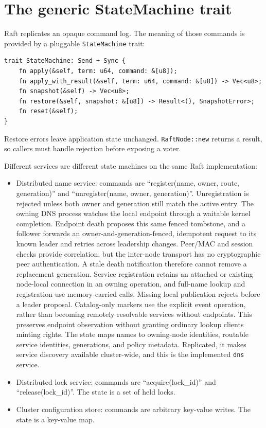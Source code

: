 \section{The generic StateMachine trait}

Raft replicates an opaque command log. The meaning of those commands is provided
by a pluggable \texttt{StateMachine} trait:

\begin{lstlisting}[style=rustCode]
trait StateMachine: Send + Sync {
    fn apply(&self, term: u64, command: &[u8]);
    fn apply_with_result(&self, term: u64, command: &[u8]) -> Vec<u8>;
    fn snapshot(&self) -> Vec<u8>;
    fn restore(&self, snapshot: &[u8]) -> Result<(), SnapshotError>;
    fn reset(&self);
}
\end{lstlisting}

Restore errors leave application state unchanged. \texttt{RaftNode::new}
returns a result, so callers must handle rejection before exposing a voter.

Different services are different state machines on the same Raft implementation:

\begin{itemize}
    \item Distributed name service: commands are
        ``register(name, owner, route, generation)'' and
        ``unregister(name, owner, generation)''. Unregistration is rejected
        unless both owner and generation still match the active entry.
        The owning DNS process watches the local endpoint through a waitable
        kernel completion. Endpoint death proposes this same fenced tombstone, and
        a follower forwards an owner-and-generation-fenced, idempotent request
        to its known leader and retries across leadership changes. Peer/MAC and
        session checks provide correlation, but the inter-node transport has no
        cryptographic peer authentication. A stale death notification
        therefore cannot remove a replacement generation.
        Service registration retains an attached or existing node-local
        connection in an owning operation, and full-name lookup and registration
        use memory-carried calls. Missing local publication rejects before a
        leader proposal. Catalog-only markers use the explicit event operation,
        rather than becoming remotely resolvable services without endpoints.
        This preserves endpoint observation without granting ordinary lookup
        clients minting rights.
        The state maps names to owning-node identities, routable service
        identities, generations, and policy metadata. Replicated, it makes
        service discovery available cluster-wide, and this is the implemented
        \texttt{dns} service.
    \item Distributed lock service: commands are ``acquire(lock\_id)''
        and ``release(lock\_id)''. The state is a set of held locks.
    \item Cluster configuration store: commands are arbitrary
        key-value writes. The state is a key-value map.
\end{itemize}

